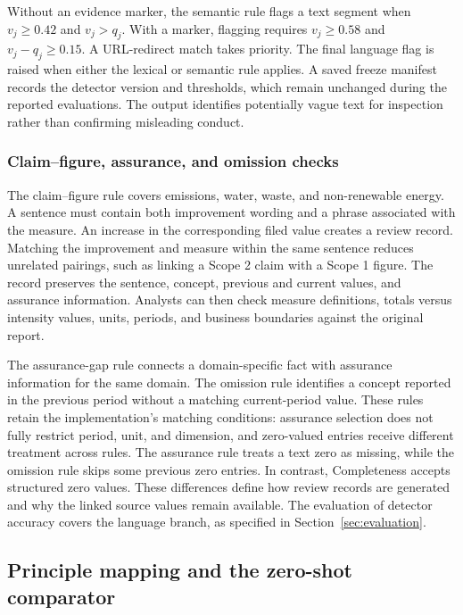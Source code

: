 Without an evidence marker, the semantic rule flags a text segment when $v_j\geq0.42$ and $v_j>q_j$. With a marker, flagging requires $v_j\geq0.58$ and $v_j-q_j\geq0.15$. A URL-redirect match takes priority. The final language flag is raised when either the lexical or semantic rule applies. A saved freeze manifest records the detector version and thresholds, which remain unchanged during the reported evaluations. The output identifies potentially vague text for inspection rather than confirming misleading conduct.

\subsubsection{Claim--figure, assurance, and omission checks}

The claim--figure rule covers emissions, water, waste, and non-renewable energy. A sentence must contain both improvement wording and a phrase associated with the measure. An increase in the corresponding filed value creates a review record. Matching the improvement and measure within the same sentence reduces unrelated pairings, such as linking a Scope 2 claim with a Scope 1 figure. The record preserves the sentence, concept, previous and current values, and assurance information. Analysts can then check measure definitions, totals versus intensity values, units, periods, and business boundaries against the original report.

The assurance-gap rule connects a domain-specific fact with assurance information for the same domain. The omission rule identifies a concept reported in the previous period without a matching current-period value. These rules retain the implementation's matching conditions: assurance selection does not fully restrict period, unit, and dimension, and zero-valued entries receive different treatment across rules. The assurance rule treats a text zero as missing, while the omission rule skips some previous zero entries. In contrast, Completeness accepts structured zero values. These differences define how review records are generated and why the linked source values remain available. The evaluation of detector accuracy covers the language branch, as specified in Section~\ref{sec:evaluation}.

\subsection{Principle mapping and the zero-shot comparator}
\label{sec:mapping}

